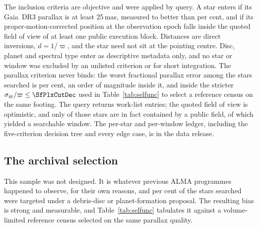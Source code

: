The inclusion criteria are objective and were applied by query. A star enters
if its Gaia~DR3 parallax is at least 25\,mas, measured to better than
\PlxAdqlPct{} per cent, and if its proper-motion-corrected position at the
observation epoch falls inside the quoted field of view of at least one
public execution block. Distances are direct inversions, $d=1/\varpi$, and
the star need not sit at the pointing centre. Disc, planet and spectral type
enter as descriptive metadata only, and no star or window was excluded by an
unlisted criterion or for short integration. The parallax criterion never
binds: the worst fractional parallax error among the stars searched is
\SfPlxWorstPct{} per cent, an order of magnitude inside it, and inside the
stricter $\sigma_\varpi/\varpi\le\SfPlxCutDec$ used in
Table~\ref{tab:selfunc} to select a reference census on the same footing.
The query returns
\NCensus{} work-list entries; the quoted field of view is optimistic, and
only \NGenuinelyCovered{} of those stars are in fact contained by a public
field, of which \NStars{} yielded a searchable window. The per-star and
per-window ledger, including the five-criterion decision tree and every edge
case, is in the data release.

\subsection{The archival selection}
\label{sec:bias}

This sample was not designed. It is whatever previous ALMA programmes
happened to observe, for their own reasons, and \PctDiscProposal{} per cent
of the stars searched were targeted under a debris-disc or planet-formation
proposal. The resulting bias is strong and measurable, and
Table~\ref{tab:selfunc} tabulates it against a volume-limited reference
census selected on the same parallax quality.

